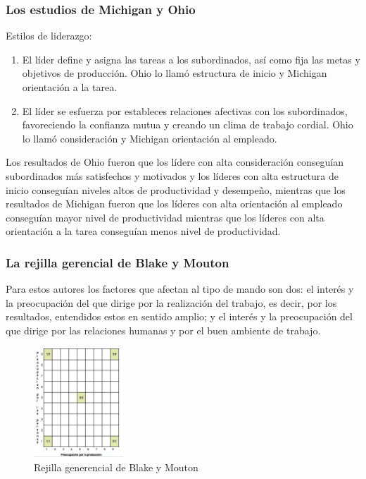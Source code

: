 \documentclass[12pt]{article}
\theoremstyle{definition_wo_parentheses}
\begin{document}
\subsubsection{Los estudios de Michigan y Ohio}
Estilos de liderazgo:
\begin{enumerate}
\item El líder define y asigna las tareas a los subordinados, así como fija las metas y objetivos de producción. Ohio lo llamó estructura de inicio y Michigan orientación a la tarea.
\item El líder se esfuerza por estableces relaciones afectivas con los subordinados, favoreciendo la confianza mutua y creando un clima de trabajo cordial. Ohio lo llamó consideración y Michigan orientación al empleado.
\end{enumerate}
Los resultados de Ohio fueron que los lídere con alta consideración conseguían subordinados más satisfechos y motivados y los líderes con alta estructura de inicio conseguían niveles altos de productividad y desempeño, mientras que los resultados de Michigan fueron que los líderes con alta orientación al empleado conseguían mayor nivel de productividad mientras que los líderes con alta orientación a la tarea conseguían menos nivel de productividad.

\subsubsection{La rejilla gerencial de Blake y Mouton}
Para estos autores los factores que afectan al tipo de mando son dos: el interés y la preocupación del que dirige por la realización del trabajo, es decir, por los resultados, entendidos estos en sentido amplio; y el interés y la preocupación del que dirige por las relaciones humanas y por el buen ambiente de trabajo.

\begin{figure}[H]
\centering
\includegraphics[width=0.3\textwidth]{blake}
\caption{Rejilla generencial de Blake y Mouton}
\label{fig:blake}
\end{figure}
\end{document}
